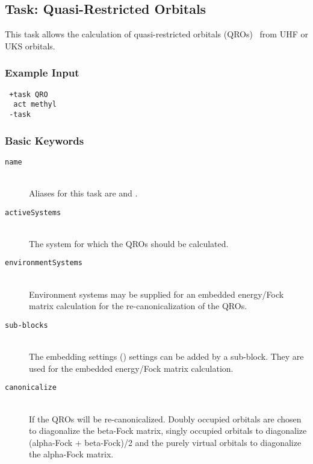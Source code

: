 \subsection{Task: Quasi-Restricted Orbitals}

This task allows the calculation of quasi-restricted orbitals (QROs)~\cite{Neese2006} from UHF or UKS orbitals.
\subsubsection{Example Input}
\begin{lstlisting}
 +task QRO
  act methyl
 -task
\end{lstlisting}

\subsubsection{Basic Keywords}
\begin{description}
 \item [\texttt{name}]\hfill \\
  Aliases for this task are  and .
 \item [\texttt{activeSystems}]\hfill \\
  The system for which the QROs should be calculated.
 \item [\texttt{environmentSystems}]\hfill \\
  Environment systems may be supplied for an embedded energy/Fock matrix calculation
  for the re-canonicalization of the QROs.
 \item[\texttt{sub-blocks}]\hfill \\
  The embedding settings () settings can be added by a sub-block. They are used for the embedded energy/Fock matrix
  calculation.
 \item [\texttt{canonicalize}]\hfill \\
  If  the QROs will be re-canonicalized. Doubly occupied orbitals are chosen to
  diagonalize the beta-Fock matrix, singly occupied orbitals to diagonalize (alpha-Fock + beta-Fock)/2
  and the purely virtual orbitals to diagonalize the alpha-Fock matrix.
\end{description}
